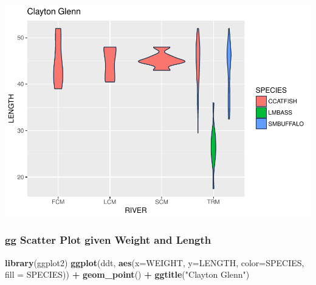 \documentclass[]{article}
\newenvironment{Shaded}{\begin{snugshade}}{\end{snugshade}}
\newcommand{\KeywordTok}[1]{\textcolor[rgb]{0.13,0.29,0.53}{\textbf{#1}}}
\newcommand{\DataTypeTok}[1]{\textcolor[rgb]{0.13,0.29,0.53}{#1}}
\newcommand{\StringTok}[1]{\textcolor[rgb]{0.31,0.60,0.02}{#1}}
\newcommand{\OperatorTok}[1]{\textcolor[rgb]{0.81,0.36,0.00}{\textbf{#1}}}
\newcommand{\NormalTok}[1]{#1}
\begin{document}
\begin{Shaded}
\end{Shaded}

\includegraphics{./tex2pdf.8500/354dd74f754e16de8fdafbd827c1ccc2a98fc4d4.pdf}

\subsubsection{gg Scatter Plot given Weight and
Length}\label{gg-scatter-plot-given-weight-and-length}

\begin{Shaded}
\begin{Highlighting}[]
\KeywordTok{library}\NormalTok{(ggplot2)}
\KeywordTok{ggplot}\NormalTok{(ddt, }\KeywordTok{aes}\NormalTok{(}\DataTypeTok{x=}\NormalTok{WEIGHT, }\DataTypeTok{y=}\NormalTok{LENGTH, }\DataTypeTok{color=}\NormalTok{SPECIES, }\DataTypeTok{fill =}\NormalTok{ SPECIES)) }\OperatorTok{+}\StringTok{ }\KeywordTok{geom_point}\NormalTok{() }\OperatorTok{+}\StringTok{ }\KeywordTok{ggtitle}\NormalTok{(}\StringTok{"Clayton Glenn"}\NormalTok{)}
\end{Highlighting}
\end{Shaded}
\end{document}
